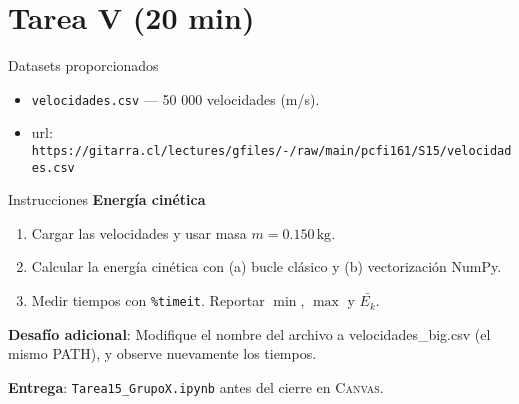 \documentclass[10pt]{beamer}
\begin{document}
\section{Tarea V (20 min)}

\begin{frame}{Datasets proporcionados}
\begin{itemize}
  \item \texttt{velocidades.csv} — 50 000 velocidades (m/s).
  \item url:
  {\footnotesize \texttt{https://gitarra.cl/lectures/gfiles/-/raw/main/pcfi161/S15/velocidades.csv}}
\end{itemize}
\end{frame}

\begin{frame}{Instrucciones}
\textbf{Energía cinética}
\begin{enumerate}
  \item Cargar las velocidades y usar masa $m = 0.150\,\text{kg}$.
  \item Calcular la energía cinética con (a) bucle clásico y (b) vectorización NumPy.
  \item Medir tiempos con \texttt{\%timeit}. Reportar $\min$, $\max$ y $\bar{E_k}$.
\end{enumerate}

\textbf{Desafío adicional}: Modifique el nombre del archivo a velocidades\_big.csv (el mismo PATH), y observe nuevamente los tiempos.


\textbf{Entrega}: \texttt{Tarea15\_GrupoX.ipynb} antes del cierre en \textsc{Canvas}.
\end{frame}

\end{document}
